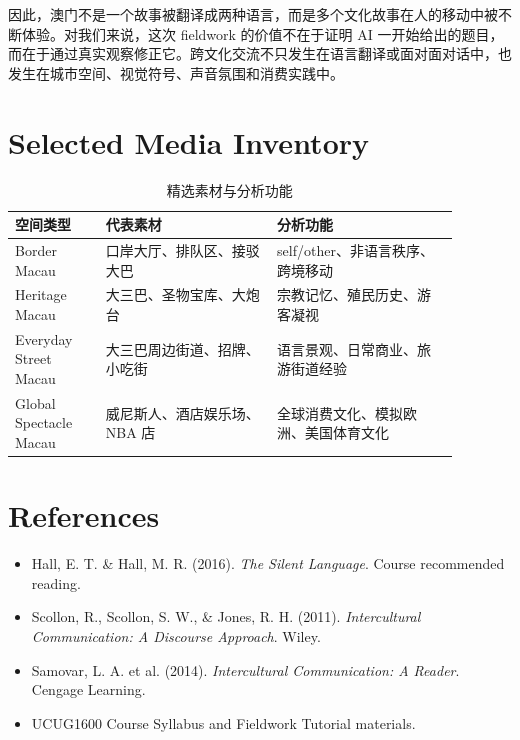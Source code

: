 \documentclass[12pt,a4paper]{article}
\begin{document}
因此，澳门不是一个故事被翻译成两种语言，而是多个文化故事在人的移动中被不断体验。对我们来说，这次 fieldwork 的价值不在于证明 AI 一开始给出的题目，而在于通过真实观察修正它。跨文化交流不只发生在语言翻译或面对面对话中，也发生在城市空间、视觉符号、声音氛围和消费实践中。

\appendix
\section{Selected Media Inventory}

\begin{table}[H]
\centering
\caption{精选素材与分析功能}
\begin{tabular}{p{0.18\linewidth}p{0.34\linewidth}p{0.36\linewidth}}
\toprule
空间类型 & 代表素材 & 分析功能 \\
\midrule
Border Macau & 口岸大厅、排队区、接驳大巴 & self/other、非语言秩序、跨境移动 \\
Heritage Macau & 大三巴、圣物宝库、大炮台 & 宗教记忆、殖民历史、游客凝视 \\
Everyday Street Macau & 大三巴周边街道、招牌、小吃街 & 语言景观、日常商业、旅游街道经验 \\
Global Spectacle Macau & 威尼斯人、酒店娱乐场、NBA 店 & 全球消费文化、模拟欧洲、美国体育文化 \\
\bottomrule
\end{tabular}
\end{table}

\section{References}

\begin{itemize}
  \item Hall, E. T. \& Hall, M. R. (2016). \textit{The Silent Language}. Course recommended reading.
  \item Scollon, R., Scollon, S. W., \& Jones, R. H. (2011). \textit{Intercultural Communication: A Discourse Approach}. Wiley.
  \item Samovar, L. A. et al. (2014). \textit{Intercultural Communication: A Reader}. Cengage Learning.
  \item UCUG1600 Course Syllabus and Fieldwork Tutorial materials.
\end{itemize}
\end{document}
